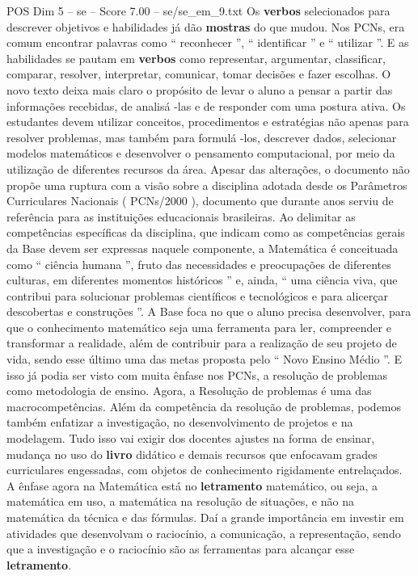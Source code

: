 \begin{textsample}{POS Dim 5 – se – Score 7.00 – se/se\_em\_9.txt}
Os \textbf{verbos} selecionados para descrever objetivos e habilidades já dão \textbf{mostras} do que mudou.
Nos PCNs, era comum encontrar palavras como “ reconhecer ”, “ identificar ” e “ utilizar ”.
E as habilidades se pautam em \textbf{verbos} como representar, argumentar, classificar, comparar, resolver, interpretar, comunicar, tomar decisões e fazer escolhas.
O novo texto deixa mais claro o propósito de levar o aluno a pensar a partir das informações recebidas, de analisá -las e de responder com uma postura ativa.
Os estudantes devem utilizar conceitos, procedimentos e estratégias não apenas para resolver problemas, mas também para formulá -los, descrever dados, selecionar modelos matemáticos e desenvolver o pensamento computacional, por meio da utilização de diferentes recursos da área.
Apesar das alterações, o documento não propõe uma ruptura com a visão sobre a disciplina adotada desde os Parâmetros Curriculares Nacionais ( PCNs/2000 ), documento que durante anos serviu de referência para as instituições educacionais brasileiras.
Ao delimitar as competências específicas da disciplina, que indicam como as competências gerais da Base devem ser expressas naquele componente, a Matemática é conceituada como “ ciência humana ”, fruto das necessidades e preocupações de diferentes culturas, em diferentes momentos históricos ” e, ainda, “ uma ciência viva, que contribui para solucionar problemas científicos e tecnológicos e para alicerçar descobertas e construções ”.
A Base foca no que o aluno precisa desenvolver, para que o conhecimento matemático seja uma ferramenta para ler, compreender e transformar a realidade, além de contribuir para a realização de seu projeto de vida, sendo esse último uma das metas proposta pelo “ Novo Ensino Médio ”.
E isso já podia ser visto com muita ênfase nos PCNs, a resolução de problemas como metodologia de ensino.
Agora, a Resolução de problemas é uma das macrocompetências.
Além da competência da resolução de problemas, podemos também enfatizar a investigação, no desenvolvimento de projetos e na modelagem.
Tudo isso vai exigir dos docentes ajustes na forma de ensinar, mudança no uso do \textbf{livro} didático e demais recursos que enfocavam grades curriculares engessadas, com objetos de conhecimento rigidamente entrelaçados.
A ênfase agora na Matemática está no \textbf{letramento} matemático, ou seja, a matemática em uso, a matemática na resolução de situações, e não na matemática da técnica e das fórmulas.
Daí a grande importância em investir em atividades que desenvolvam o raciocínio, a comunicação, a representação, sendo que a investigação e o raciocínio são as ferramentas para alcançar esse \textbf{letramento}.

\end{textsample}

